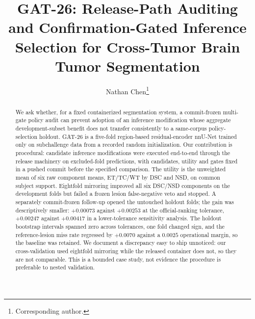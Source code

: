 \documentclass[runningheads]{llncs}
\begin{document}
\title{GAT-26: Release-Path Auditing and Confirmation-Gated Inference Selection for Cross-Tumor
Brain Tumor Segmentation}

\author{Nathan Chen\thanks{Corresponding author.}}

\maketitle

\begin{abstract}
We ask whether, for a fixed containerized segmentation system, a commit-frozen multi-gate policy
audit can prevent adoption of an inference modification whose aggregate development-subset benefit
does not transfer consistently to a same-corpus policy-selection holdout. GAT-26 is a five-fold region-based
residual-encoder nnU-Net trained only on subchallenge data from a recorded random initialization. Our
contribution is procedural: candidate inference modifications were executed end-to-end through the
release machinery on excluded-fold predictions, with candidates, utility and gates fixed in a pushed
commit before the specified comparison. The utility is the unweighted mean of six raw component
means, ET/TC/WT by DSC and NSD, on common subject support. Eightfold mirroring improved all six
DSC/NSD components on the development folds but failed a frozen lesion false-negative veto and
stopped. A separately commit-frozen follow-up opened the untouched holdout folds; the gain was
descriptively smaller: $+0.00073$ against $+0.00253$ at the official-ranking tolerance, $+0.00247$
against $+0.00417$ in a lower-tolerance sensitivity analysis. The holdout bootstrap intervals spanned
zero across tolerances, one fold changed sign, and the reference-lesion miss rate regressed by
$+0.0070$ against a $0.0025$ operational margin, so the baseline was retained. We document a
discrepancy easy to ship unnoticed: our cross-validation used eightfold mirroring while the released
container does not, so they are not comparable. This is a bounded case study, not evidence the
procedure is preferable to nested validation.
\end{abstract}
\end{document}

